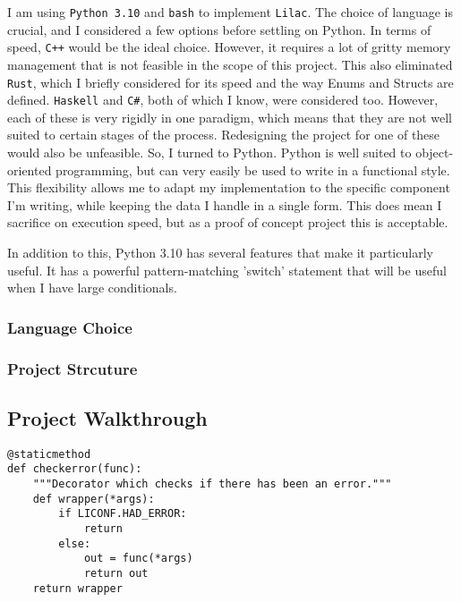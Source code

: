 \documentclass[a4paper, 12pt]{article}
\begin{document}
I am using \verb|Python 3.10| and \verb|bash| to implement \verb|Lilac|. The choice of language is crucial, and I considered a few options before settling on Python. In terms of speed, \verb|C++| would be the ideal choice. However, it requires a lot of gritty memory management that is not feasible in the scope of this project. This also eliminated \verb|Rust|, which I briefly considered for its speed and the way Enums and Structs are defined. \verb|Haskell| and \verb|C#|, both of which I know, were considered too. However, each of these is very rigidly in one paradigm, which means that they are not well suited to certain stages of the process. Redesigning the project for one of these would also be unfeasible. So, I turned to Python. Python is well suited to object-oriented programming, but can very easily be used to write in a functional style. This flexibility allows me to adapt my implementation to the specific component I'm writing, while keeping the data I handle in a single form. This does mean I sacrifice on execution speed, but as a proof of concept project this is acceptable.

In addition to this, Python 3.10 has several features that make it particularly useful. It has a powerful pattern-matching 'switch' statement that will be useful when I have large conditionals.

\subsubsection{Language Choice}
\subsubsection{Project Strcuture}
\subsection{Project Walkthrough}

\begin{verbatim}
@staticmethod 
def checkerror(func):
    """Decorator which checks if there has been an error."""
    def wrapper(*args):
        if LICONF.HAD_ERROR:
            return
        else:
            out = func(*args)
            return out
    return wrapper
\end{verbatim}
\end{document}

